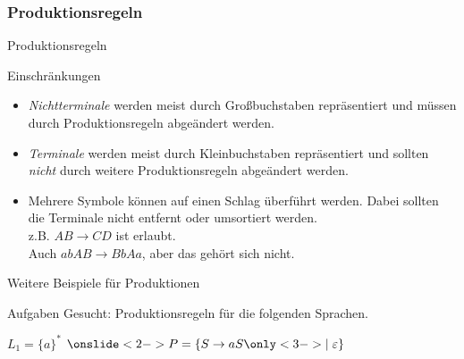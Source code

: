 \subsubsection{Produktionsregeln}
\begin{frame}{Produktionsregeln}
    \begin{alertblock}{Einschränkungen}
    \begin{itemize}
        \item \alert{\emph{Nichtterminale}} werden meist durch Großbuchstaben repräsentiert und müssen durch Produktionsregeln abgeändert werden.
        \item \alert{\emph{Terminale}} werden meist durch Kleinbuchstaben repräsentiert und sollten \emph{nicht} durch weitere Produktionsregeln abgeändert werden.
        \item Mehrere Symbole können auf einen Schlag überführt werden. Dabei sollten die Terminale nicht entfernt oder umsortiert werden.\\
        z.B. $AB \rightarrow CD$ ist erlaubt.\\
        Auch $abAB \rightarrow BbAa$, aber das gehört sich nicht.
    \end{itemize}
    \end{alertblock}
\end{frame}

\begin{frame}{Weitere Beispiele für Produktionen}
    \begin{alertblock}{Aufgaben}
    Gesucht: Produktionsregeln für die folgenden Sprachen.
    \end{alertblock}
    \begin{exampleblock}{$L_1 = \{a\}^*$}
    $\onslide<2->{P=\{S \rightarrow aS \only<3->{\mid \emptyWord\}}}$
    \end{exampleblock}
\end{frame}

